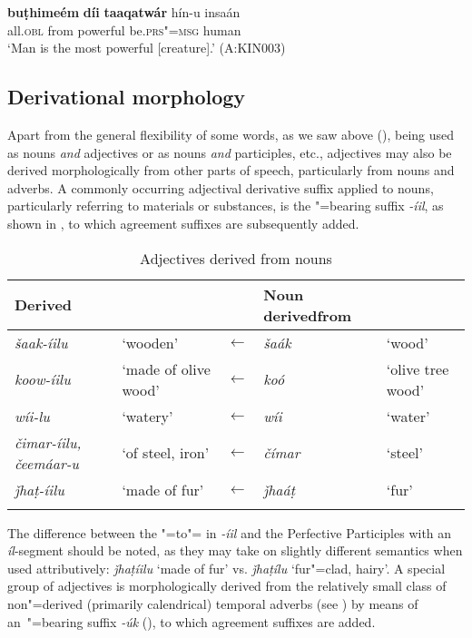 \begin{exe}
\ex
\label{ex:6-9}
\gll \textbf{buṭhimeém} \textbf{díi} \textbf{taaqatwár} hín-u insaán \\
all.\textsc{obl} from powerful be.\textsc{prs"=msg} human \\
\glt `Man is the most powerful [creature].' (A:KIN003)
\end{exe}

\subsection{Derivational morphology}
\label{subsec:6-3-4}

Apart from the general flexibility of some words, as we saw above (), being used as nouns \textit{and} adjectives or as nouns \textit{and} participles, etc., adjectives may also be derived morphologically from other parts of speech, particularly from nouns and adverbs. A commonly occurring adjectival derivative suffix applied to nouns, particularly referring to materials or substances, is the "=bearing  suffix \textit{-íil}, as shown in , to which agreement suffixes are subsequently added.


\begin{table}[ht]
\caption{Adjectives derived from nouns}
\begin{tabularx}{\textwidth}{ Q l l P{22mm} l }
\lsptoprule
Derived  &
&
&
Noun derived\newline from &
\\\hline
\textit{šaak-íilu} &
`wooden' &
$\leftarrow$ &
\textit{šaák} &
`wood'\\
\textit{koow-íilu} &
`made of olive wood' &
$\leftarrow$ &
\textit{koó} &
`olive tree wood'\\
\textit{wíi-lu} &
`watery' &
$\leftarrow$ &
\textit{wíi} &
`water'\\
\textit{čimar-íilu, čeemáar-u} &
`of steel, iron' &
$\leftarrow$ &
\textit{čímar} &
`steel'\\
\textit{ǰhaṭ-íilu} &
`made of fur' &
$\leftarrow$ &
\textit{ǰhaáṭ} &
`fur'\\\lspbottomrule
\end{tabularx}
\label{tab:6-5}
\end{table}


The difference between the "=to"=  in \textit{-íil} and the Perfective Participles with an \textit{íl}-segment should be noted, as they may take on slightly different semantics when used attributively: \textit{ǰhaṭíilu} `made of fur' vs. \textit{ǰhaṭílu} `fur"=clad, hairy'. A special group of adjectives is morphologically derived from the relatively small class of non"=derived (primarily calendrical) temporal adverbs (see ) by means of an~"=bearing suffix \textit{-úk} (), to which agreement suffixes are added.


